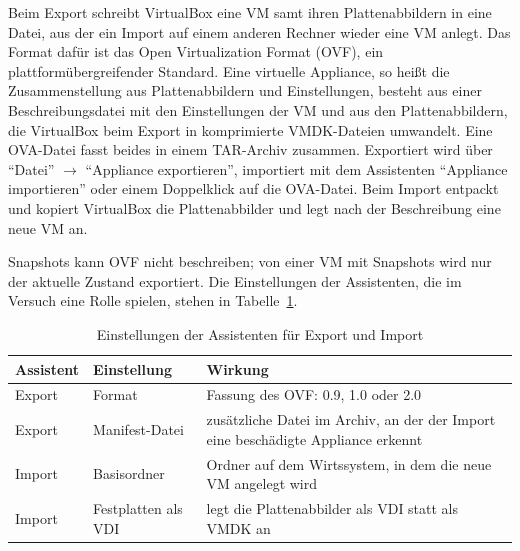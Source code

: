 Beim Export schreibt VirtualBox eine VM samt ihren Plattenabbildern in eine Datei, aus der ein Import auf einem anderen Rechner wieder eine VM anlegt. Das Format dafür ist das Open Virtualization Format (OVF), ein plattformübergreifender Standard. Eine virtuelle Appliance, so heißt die Zusammenstellung aus Plattenabbildern und Einstellungen, besteht aus einer Beschreibungsdatei  mit den Einstellungen der VM und aus den Plattenabbildern, die VirtualBox beim Export in komprimierte VMDK-Dateien umwandelt. Eine OVA-Datei fasst beides in einem TAR-Archiv zusammen. Exportiert wird über \enquote{Datei} $\rightarrow$ \enquote{Appliance exportieren}, importiert mit dem Assistenten \enquote{Appliance importieren} oder einem Doppelklick auf die OVA-Datei. Beim Import entpackt und kopiert VirtualBox die Plattenabbilder und legt nach der Beschreibung eine neue VM an.

Snapshots kann OVF nicht beschreiben; von einer VM mit Snapshots wird nur der aktuelle Zustand exportiert. Die Einstellungen der Assistenten, die im Versuch eine Rolle spielen, stehen in Tabelle~\ref{tab:ei-einstellungen}.

\begin{table}[H]
\centering
\caption{Einstellungen der Assistenten für Export und Import}
\label{tab:ei-einstellungen}
\begin{tabularx}{\textwidth}{@{}ll>{\raggedright\arraybackslash}X@{}}
\toprule
\textbf{Assistent} & \textbf{Einstellung} & \textbf{Wirkung} \\
\midrule
Export & Format & Fassung des OVF: 0.9, 1.0 oder 2.0 \\
Export & Manifest-Datei & zusätzliche Datei im Archiv, an der der Import eine beschädigte Appliance erkennt \\
Import & Basisordner & Ordner auf dem Wirtssystem, in dem die neue VM angelegt wird \\
Import & Festplatten als VDI & legt die Plattenabbilder als VDI statt als VMDK an \\
\bottomrule
\end{tabularx}
\end{table}


